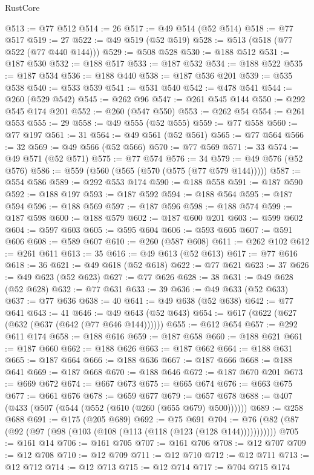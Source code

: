 \begin{lexlean}{RustCore}
\begin{coremodule}
@513 := @77 @512
@514 := 26
@517 := @49 @514 (@52 @514)
@518 := @77 @517
@519 := 27
@522 := @49 @519 (@52 @519)
@528 := @513 (@518 (@77 @522 (@77 @440 @144)))
@529 := @508 @528
@530 := @188 @512
@531 := @187 @530
@532 := @188 @517
@533 := @187 @532
@534 := @188 @522
@535 := @187 @534
@536 := @188 @440
@538 := @187 @536 @201
@539 := @535 @538
@540 := @533 @539
@541 := @531 @540
@542 := @478 @541
@544 := @260 (@529 @542)
@545 := @262 @96
@547 := @261 @545 @144
@550 := @292 @545 @174 @201
@552 := @260 (@547 @550)
@553 := @262 @54
@554 := @261 @553
@555 := 29
@558 := @49 @555 (@52 @555)
@559 := @77 @558
@560 := @77 @197
@561 := 31
@564 := @49 @561 (@52 @561)
@565 := @77 @564
@566 := 32
@569 := @49 @566 (@52 @566)
@570 := @77 @569
@571 := 33
@574 := @49 @571 (@52 @571)
@575 := @77 @574
@576 := 34
@579 := @49 @576 (@52 @576)
@586 := @559 (@560 (@565 (@570 (@575 (@77 @579 @144)))))
@587 := @554 @586
@589 := @292 @553 @174
@590 := @188 @558
@591 := @187 @590
@592 := @188 @197
@593 := @187 @592
@594 := @188 @564
@595 := @187 @594
@596 := @188 @569
@597 := @187 @596
@598 := @188 @574
@599 := @187 @598
@600 := @188 @579
@602 := @187 @600 @201
@603 := @599 @602
@604 := @597 @603
@605 := @595 @604
@606 := @593 @605
@607 := @591 @606
@608 := @589 @607
@610 := @260 (@587 @608)
@611 := @262 @102
@612 := @261 @611
@613 := 35
@616 := @49 @613 (@52 @613)
@617 := @77 @616
@618 := 36
@621 := @49 @618 (@52 @618)
@622 := @77 @621
@623 := 37
@626 := @49 @623 (@52 @623)
@627 := @77 @626
@628 := 38
@631 := @49 @628 (@52 @628)
@632 := @77 @631
@633 := 39
@636 := @49 @633 (@52 @633)
@637 := @77 @636
@638 := 40
@641 := @49 @638 (@52 @638)
@642 := @77 @641
@643 := 41
@646 := @49 @643 (@52 @643)
@654 := @617 (@622 (@627 (@632 (@637 (@642 (@77 @646 @144))))))
@655 := @612 @654
@657 := @292 @611 @174
@658 := @188 @616
@659 := @187 @658
@660 := @188 @621
@661 := @187 @660
@662 := @188 @626
@663 := @187 @662
@664 := @188 @631
@665 := @187 @664
@666 := @188 @636
@667 := @187 @666
@668 := @188 @641
@669 := @187 @668
@670 := @188 @646
@672 := @187 @670 @201
@673 := @669 @672
@674 := @667 @673
@675 := @665 @674
@676 := @663 @675
@677 := @661 @676
@678 := @659 @677
@679 := @657 @678
@688 := @407 (@433 (@507 (@544 (@552 (@610 (@260 (@655 @679) @500))))))
@689 := @258 @688
@691 := @175 (@205 @689)
@692 := @75 @691
@704 := @76 (@82 (@87 (@92 (@97 (@98 (@103 (@108 (@113 (@118 (@123 (@128 @144)))))))))))
@705 := @161 @14
@706 := @161 @705
@707 := @161 @706
@708 := @12 @707
@709 := @12 @708
@710 := @12 @709
@711 := @12 @710
@712 := @12 @711
@713 := @12 @712
@714 := @12 @713
@715 := @12 @714
@717 := @704 @715 @174

\end{coremodule}
\end{lexlean}
